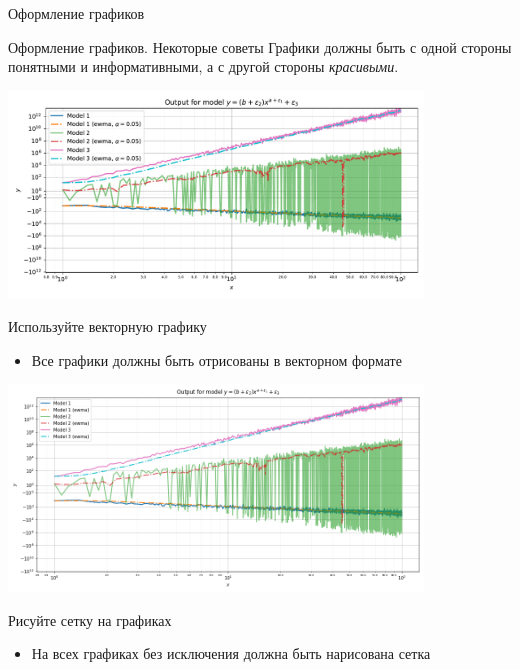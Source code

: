 \documentclass[fleqn, xcolor=x11names]{beamer}
\begin{document}
\begin{section}{Оформление графиков}

\begin{frame}{Оформление графиков. Некоторые советы}
    Графики должны быть с одной стороны понятными и информативными, а с другой стороны \textit{красивыми}.

	\begin{center}
		\includegraphics[height=5.5cm]{bad_plots/good_plot.pdf}
	\end{center}
\end{frame}

\begin{frame}{Используйте векторную графику}
    \begin{itemize}
        \item Все графики должны быть отрисованы в векторном формате
    \end{itemize}

	\begin{center}
		\includegraphics[height=5.5cm]{bad_plots/non_vector_plot.png}
	\end{center}
\end{frame}

\begin{frame}{Рисуйте сетку на графиках}
    \begin{itemize}
        \item На всех графиках без исключения должна быть нарисована сетка
    \end{itemize}


\end{frame}
\end{section}
\end{document}
